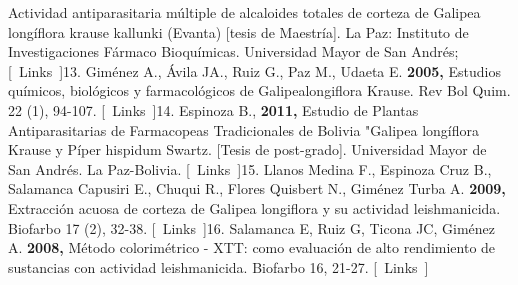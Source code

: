\documentclass{article}
\begin{document}
Actividad antiparasitaria múltiple de alcaloides totales de corteza de Galipea longíflora krause kallunki (Evanta) [tesis de Maestría]. La Paz: Instituto de Investigaciones Fármaco Bioquímicas. Universidad Mayor de San Andrés;    [ Links ]13. Giménez A., Ávila JA., Ruiz G., Paz M., Udaeta E. \textbf{2005, }
Estudios químicos, biológicos y farmacológicos de Galipealongiflora Krause. Rev Bol Quim. 22 (1), 94-107.    [ Links ]14. Espinoza B., \textbf{2011, }
Estudio de Plantas Antiparasitarias de Farmacopeas Tradicionales de Bolivia "Galipea longíflora Krause y Píper hispidum Swartz. [Tesis de post-grado]. Universidad Mayor de San Andrés. La Paz-Bolivia.    [ Links ]15. Llanos Medina F., Espinoza Cruz B., Salamanca Capusiri E., Chuqui R., Flores Quisbert N., Giménez Turba A. \textbf{2009, }
Extracción acuosa de corteza de Galipea longiflora y su actividad leishmanicida. Biofarbo 17 (2), 32-38.    [ Links ]16. Salamanca E, Ruiz G, Ticona JC, Giménez A. \textbf{2008, }
Método colorimétrico - XTT: como evaluación de alto rendimiento de sustancias con actividad leishmanicida. Biofarbo 16, 21-27.    [ Links ]
\end{document}
